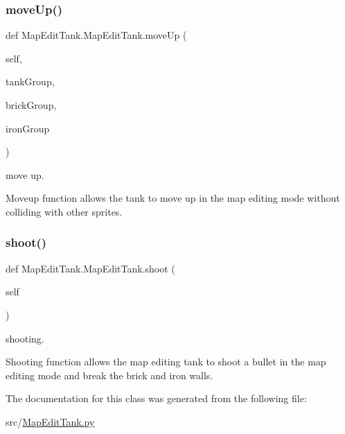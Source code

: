 \subsubsection{\texorpdfstring{moveUp()}{moveUp()}}
{\footnotesize\ttfamily def Map\+Edit\+Tank.\+Map\+Edit\+Tank.\+move\+Up (\begin{DoxyParamCaption}\item[{}]{self,  }\item[{}]{tank\+Group,  }\item[{}]{brick\+Group,  }\item[{}]{iron\+Group }\end{DoxyParamCaption})}



move up. 

Moveup function allows the tank to move up in the map editing mode without colliding with other sprites. \mbox{\label{class_map_edit_tank_1_1_map_edit_tank_a7d9e967d520fd8f5cccf25d6458f9171}} 
\subsubsection{\texorpdfstring{shoot()}{shoot()}}
{\footnotesize\ttfamily def Map\+Edit\+Tank.\+Map\+Edit\+Tank.\+shoot (\begin{DoxyParamCaption}\item[{}]{self }\end{DoxyParamCaption})}



shooting. 

Shooting function allows the map editing tank to shoot a bullet in the map editing mode and break the brick and iron walls. 

The documentation for this class was generated from the following file\+:\begin{DoxyCompactItemize}
\item 
src/\mbox{\hyperlink{_map_edit_tank_8py}{Map\+Edit\+Tank.\+py}}\end{DoxyCompactItemize}
